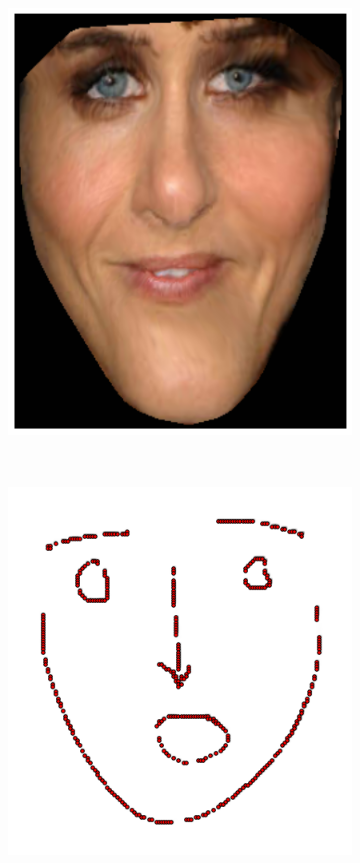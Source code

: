 \begin{figure}[h!]
\begin{subfigure}[b]{0.1\textwidth}
            \includegraphics[width=\textwidth]{resources/Fig_Draw/test_01_of}
    \end{subfigure}
    \\
    \begin{subfigure}[b]{0.1\textwidth}
            \includegraphics[width=\textwidth]{resources/Fig_Draw/test_02}

\end{subfigure}
\end{figure}
